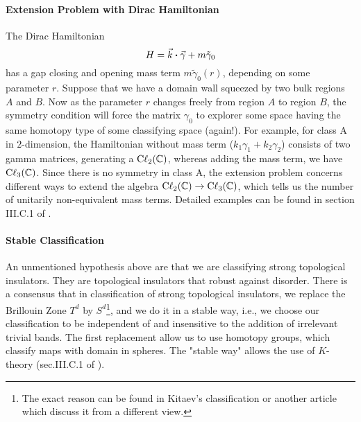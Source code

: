 \paragraph{Extension Problem with Dirac Hamiltonian}
The Dirac Hamiltonian
\begin{equation}
    H = \vec{k}\vdot \vec{\gamma} + m\tilde{\gamma}_0
\end{equation}
has a gap closing and opening mass term $m\tilde{\gamma}_0(r)$, depending on some
parameter $r$. Suppose that we have a domain wall squeezed by two bulk regions
$A$ and $B$. Now as the parameter $r$ changes freely from region $A$ to region
$B$, the symmetry condition will force the matrix $\gamma_0$ to explorer some
space having the same homotopy type of some classifying space (again!). For
example, for class $\mathrm{A}$ in $2$-dimension, the Hamiltonian without mass
term ($k_1\gamma_1 + k_2\gamma_2$) consists of two gamma matrices, generating a
$\mathrm{C\ell}_{2}(\mathbb{C})$, whereas adding the mass term, we have
$\mathrm{C\ell}_{3}(\mathbb{C})$. Since there is no symmetry in class $\mathrm{A}$, the
extension problem concerns different ways to extend the algebra
$\mathrm{C\ell}_{2}(\mathbb{C})\to \mathrm{C\ell}_{3}(\mathbb{C})$, which tells us the number of
unitarily non-equivalent mass terms. Detailed examples can be found in section
III.C.1 of \cite{Chiu2016}.

\paragraph{Stable Classification} An unmentioned hypothesis above are that we
are classifying strong topological insulators. They are topological insulators
that robust against disorder\cite{Fu2007}. There is a consensus that in
classification of strong topological insulators, we replace the Brillouin Zone
$T^d$ by $S^d$\footnote{The exact reason can be found in Kitaev's
    classification\cite{Kitaev2009a} or another article \cite{Kennedy2015} which
discuss it from a different view.}, and we do it in a stable way, i.e., we choose
our classification to be independent of and insensitive to the addition of
irrelevant trivial bands. The first replacement allow us to use homotopy groups,
which classify maps with domain in spheres. The "stable way" allows the use of
$K$-theory (sec.III.C.1 of \cite{Chiu2016}).

